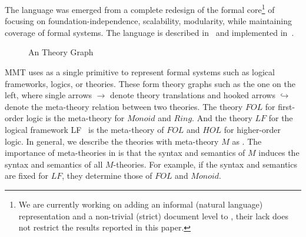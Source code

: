 The {\mmt} language was emerged from a complete redesign of the formal core\footnote{We are currently
  working on adding an informal (natural language) representation and a non-trivial (strict)
  document level to {\mmt}, their lack does not restrict the results reported in this paper.} of \omdoc
focusing on foundation-independence, scalability, modularity, while maintaining coverage of formal
systems. The {\mmt} language is described in~\cite{RK:mmt:10} and implemented
in~\cite{project:mmt}.

\begin{wrapfigure}{l}{5.2cm}\vspace*{-2em}
\begin{center}
\caption{An {\mmt} Theory Graph}\label{fig:mmt:intro:metatheory}
\end{center}\vspace*{-2em}
\end{wrapfigure}

MMT uses  as a single primitive to represent formal systems such as logical frameworks, logics, or theories.
These form theory graphs such as the one on the left, where single arrows $\rightarrow$ denote theory translations and hooked arrows $\hookrightarrow$ denote the meta-theory relation between two theories.
The theory $\mathit{FOL}$ for first-order logic is the meta-theory for $\mathit{Monoid}$ and $\mathit{Ring}$. And the theory $\mathit{LF}$
for the logical framework LF~\cite{lf} is the meta-theory of $\mathit{FOL}$ and $\mathit{HOL}$ for higher-order logic.
In general, we describe the theories with meta-theory $M$ as .
The importance of meta-theories in {\mmt} is that the syntax and semantics of $M$ induces the syntax and semantics of all $M$-theories.
For example, if the syntax and semantics are fixed for $\mathit{LF}$, they determine those of $\mathit{FOL}$ and $\mathit{Monoid}$.

